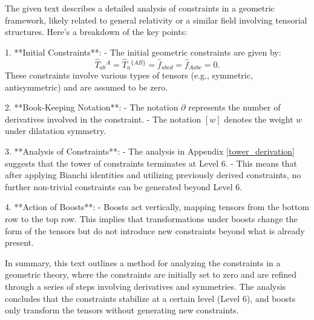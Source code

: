 The given text describes a detailed analysis of constraints in a geometric framework, likely related to general relativity or a similar field involving tensorial structures. Here's a breakdown of the key points:

1. **Initial Constraints**:
   - The initial geometric constraints are given by:
     \[
     \hat T_{ab}{}^A = \hat T_a{}^{\{AB\}} = \hat f_{abcd} = \hat f_{Aabc} = 0.
     \]
   These constraints involve various types of tensors (e.g., symmetric, antisymmetric) and are assumed to be zero.

2. **Book-Keeping Notation**:
   - The notation $\partial$ represents the number of derivatives involved in the constraint.
   - The notation $[w]$ denotes the weight $w$ under dilatation symmetry.

3. **Analysis of Constraints**:
   - The analysis in Appendix \ref{tower_derivation} suggests that the tower of constraints terminates at Level 6.
   - This means that after applying Bianchi identities and utilizing previously derived constraints, no further non-trivial constraints can be generated beyond Level 6.

4. **Action of Boosts**:
   - Boosts act vertically, mapping tensors from the bottom row to the top row. This implies that transformations under boosts change the form of the tensors but do not introduce new constraints beyond what is already present.

In summary, this text outlines a method for analyzing the constraints in a geometric theory, where the constraints are initially set to zero and are refined through a series of steps involving derivatives and symmetries. The analysis concludes that the constraints stabilize at a certain level (Level 6), and boosts only transform the tensors without generating new constraints.